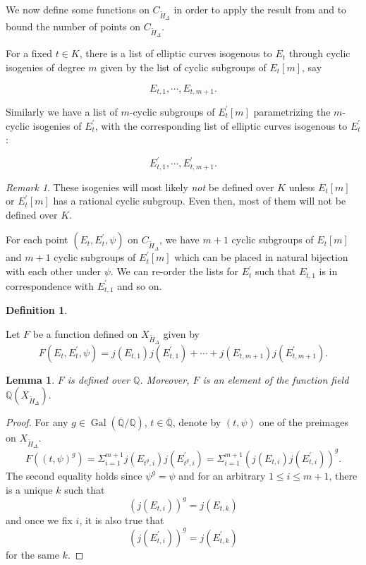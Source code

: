 \documentclass[12pt]{amsart}
\newtheorem{lem}[thm]{Lemma}
\theoremstyle{definition}
\newtheorem{defn}[thm]{Definition}
\theoremstyle{remark}
\newtheorem{remark}[thm]{Remark}
\numberwithin{equation}{section}
\newcommand{\Q}{\mathbb{Q}}
\DeclareMathOperator{\Gal}{Gal}
\begin{document}
We now define some functions on $C_{\tilde{H}_{\Delta}}$ in order to apply the result from \cite{CCDN19} and to bound the number of points on $C_{\tilde{H}_{\Delta}}$.

For a fixed $t \in K$, there is a list of elliptic curves isogenous to $E_{t}$ through cyclic isogenies of degree $m$ given by the list of cyclic subgroups of $E_{t}[m]$, say

$$E_{t,1},\cdots, E_{t,m+1}.$$


Similarly we have a list of $m$-cyclic subgroups of $E_{t}^{\prime}[m]$ parametrizing the $m$-cyclic isogenies of $E_{t}^{\prime}$, with the corresponding list of elliptic curves isogenous to $E_{t}^{\prime}$: 

$$E_{t,1}^{\prime},\cdots, E_{t, m+1}^{\prime}.$$

\begin{remark}
	These isogenies will most likely \textit{not} be defined over $K$ unless $E_{t}[m]$ or $E_{t}^{\prime}[m]$ has a rational cyclic subgroup. Even then, most of them will not be defined over $K$.
\end{remark}

For each point $(E_{t}, E_{t}^{\prime}, \psi)$ on $C_{\tilde{H}_\Delta}$, we have $m+1$ cyclic subgroups of $E_{t}[m]$ and $m+1$ cyclic subgroups of $E_{t}^{\prime}[m]$ which can be placed in natural bijection with each other under $\psi$. We can re-order the lists for $E_{t}^{\prime}$ such that $E_{t,1}$ is in correspondence with $E_{t,1}^{\prime}$ and so on.
\vspace{1em}
 
\begin{defn}\label{F}

	Let $F$ be a function defined on $X_{\tilde{H}_{\Delta}}$ given by
	$$F(E_{t}, E_{t}^{\prime}, \psi)=j(E_{t,1})j(E^{\prime}_{t,1})+ \cdots +j(E_{t, m+1})j(E^{\prime}_{t, m+1}).$$
	
	\end{defn}
\vspace{1em}
\begin{lem}

$F$ is defined over $\Q$. Moreover, $F$ is an element of the function field $\Q(X_{\tilde{H}_{\Delta}}).$	
\end{lem}

\begin{proof}

	For any $g \in \Gal(\overline{\Q}/\Q)$, $t \in \overline{\Q}$, denote by $(t, \psi)$ one of the preimages on $X_{\tilde{H}_{\Delta}}$. 
	$$F((t,\psi)^{g})=\Sigma_{i=1}^{m+1} j(E_{t^{g},i})j(E^{\prime}_{t^{g},i})= \Sigma_{i=1}^{m+1} (j(E_{t,i})j(E^{\prime}_{t,i}))^{g}.$$
	The second equality holds since $\psi^{g}=\psi$ and for an arbitrary $1 \le i \le m+1$, there is a unique $k$ such that 
	$$(j(E_{t,i}))^{g}=j(E_{t,k})$$
	and once we fix $i$, it is also true that  
	$$(j(E_{t,i}^{\prime}))^{g}=j(E_{t,k}^{\prime})$$ 
	for the same $k$.

\end{proof}
\end{document}
